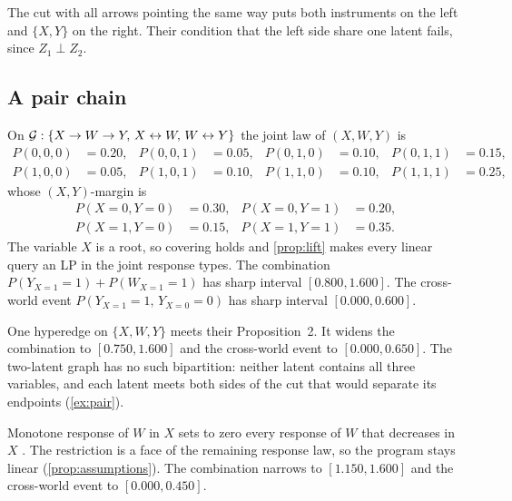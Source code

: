 The cut with all arrows pointing the same way puts both instruments on the left and $\{X,Y\}$ on the right. Their condition that the left side share one latent fails, since $Z_1\perp Z_2$.

\subsection{A pair chain}
\label{sec:ill-pair}

On $\mathcal{G}:\{X\to W\to Y,\, X\leftrightarrow W,\, W\leftrightarrow Y\}$ the joint law of $(X,W,Y)$ is
\begin{equation}
\label{eq:re2}
\begin{aligned}
P(0,0,0)&=0.20,& P(0,0,1)&=0.05,& P(0,1,0)&=0.10,& P(0,1,1)&=0.15,\\
P(1,0,0)&=0.05,& P(1,0,1)&=0.10,& P(1,1,0)&=0.10,& P(1,1,1)&=0.25,
\end{aligned}
\end{equation}
whose $(X,Y)$-margin is
\begin{equation}
\label{eq:re1}
\begin{aligned}
P(X{=}0,Y{=}0)&=0.30,& P(X{=}0,Y{=}1)&=0.20,\\
P(X{=}1,Y{=}0)&=0.15,& P(X{=}1,Y{=}1)&=0.35.
\end{aligned}
\end{equation}
The variable $X$ is a root, so covering holds and \cref{prop:lift} makes every linear query an LP in the joint response types. The combination $P(Y_{X=1}{=}1)+P(W_{X=1}{=}1)$ has sharp interval $[0.800,1.600]$. The cross-world event $P(Y_{X=1}{=}1,\,Y_{X=0}{=}0)$ has sharp interval $[0.000,0.600]$.

One hyperedge on $\{X,W,Y\}$ meets their Proposition~2. It widens the combination to $[0.750,1.600]$ and the cross-world event to $[0.000,0.650]$. The two-latent graph has no such bipartition: neither latent contains all three variables, and each latent meets both sides of the cut that would separate its endpoints (\cref{ex:pair}).

Monotone response of $W$ in $X$ sets to zero every response of $W$ that decreases in $X$ \citep{manski1997monotone}. The restriction is a face of the remaining response law, so the program stays linear (\cref{prop:assumptions}). The combination narrows to $[1.150,1.600]$ and the cross-world event to $[0.000,0.450]$.
